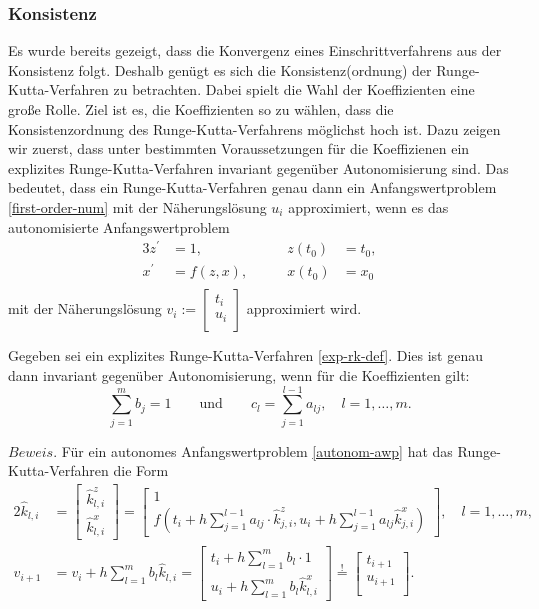 \subsubsection{Konsistenz}
Es wurde bereits gezeigt, dass die Konvergenz eines Einschrittverfahrens aus der Konsistenz folgt. Deshalb genügt es
sich die Konsistenz(ordnung) der Runge-Kutta-Verfahren zu betrachten. Dabei spielt die Wahl der Koeffizienten eine
große Rolle. Ziel ist es, die Koeffizienten so zu wählen, dass die Konsistenzordnung des Runge-Kutta-Verfahrens
möglichst hoch ist. Dazu zeigen wir zuerst, dass unter bestimmten Voraussetzungen für die Koeffizienen ein explizites
Runge-Kutta-Verfahren invariant gegenüber Autonomisierung sind. Das bedeutet, dass ein Runge-Kutta-Verfahren genau dann
ein Anfangswertproblem \eqref{first-order-num} mit der Näherungslösung $u_i$ approximiert, wenn es das autonomisierte
Anfangswertproblem
\begin{alignat}{3}
    \label{autonom-awp}
    z^{\prime} &= 1, \qquad &z(t_0) &= t_0, \\
    x^{\prime} &= f(z,x),\qquad  &x(t_0) &= x_0 \nonumber \\ \nonumber
\end{alignat}
mit der Näherungslösung $v_i := \left[ \begin{matrix}
                                           t_i\\
                                           u_i\\
\end{matrix} \right]$
approximiert wird.
\begin{satz}
    Gegeben sei ein explizites Runge-Kutta-Verfahren \eqref{exp-rk-def}. Dies ist genau dann invariant gegenüber
    Autonomisierung, wenn für die Koeffizienten gilt:
    \[
        \sum_{j=1}^{m} b_j = 1 \qquad \text{und} \qquad c_l=\sum_{j=1}^{l-1} a_{lj}, \quad l = 1, \dots, m.
    \]
\end{satz}
$Beweis.$ Für ein autonomes Anfangswertproblem \eqref{autonom-awp} hat das Runge-Kutta-Verfahren die Form
\begin{alignat*}{2}
    \hat{k}_{l,i} &= \begin{bmatrix} \hat{k}^{z}_{l,i} \\ \hat{k}^{x}_{l,i} \end{bmatrix}
    = \begin{bmatrix} 1 \\
    f\left( t_i + h \sum\limits_{j=1}^{l-1} a_{lj} \cdot \hat{k}^{z}_{j,i},
    u_i + h \sum\limits_{j=1}^{l-1} a_{lj} \hat{k}^{x}_{j,i} \right)
    \end{bmatrix},  \quad l=1,\dots,m, \\
    v_{i+1} &= v_i + h \sum\limits_{l=1}^{m} b_l \hat{k}_{l,i} =
    \begin{bmatrix}
         t_i + h \sum\limits_{l=1}^{m} b_l \cdot 1\\
         u_i + h \sum\limits_{l=1}^{m} b_l \hat{k}^{x}_{l,i}
    \end{bmatrix}
    \overset{!}{=}\begin{bmatrix}t_{i+1}\\u_{i+1}\\\end{bmatrix}.
\end{alignat*}
